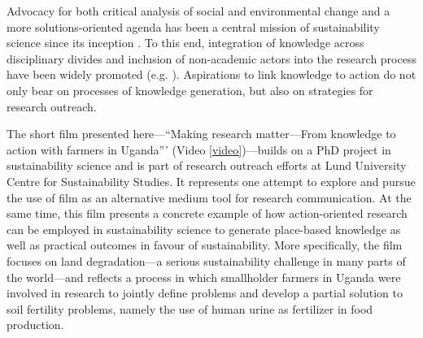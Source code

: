 \documentclass[10pt,a4paper]{article}
\begin{document}
\par\endgroup
 
\setlength{\parindent}{0.5cm}
\setlength{\parskip}{0cm}
\setlength{\bibsep}{0cm}

\vspace*{5mm}

\begin{multicols}{2}

\noindent Advocacy for both critical analysis of social and environmental change and a more solutions-oriented agenda has been a central mission of sustainability science since its inception \citep{r08}. To this end, integration of knowledge across disciplinary divides and inclusion of non-academic actors into the research process have been widely promoted (e.g. \citep{r01, r02, r03}). Aspirations to link knowledge to action do not only bear on processes of knowledge generation, but also on strategies for research outreach.

The short film presented here---``Making research matter---From knowledge to action with farmers in Uganda''' (Video \ref{video})---builds on a PhD project in sustainability science \citep{r04} and is part of research outreach efforts at Lund University Centre for Sustainability Studies. It represents one attempt to explore and pursue the use of film as an alternative medium tool for research communication. At the same time, this film presents a concrete example of how action-oriented research can be employed in sustainability science to generate place-based knowledge as well as practical outcomes in favour of sustainability. More specifically, the film focuses on land degradation---a serious sustainability challenge in many parts of the world---and reflects a process in which smallholder farmers in Uganda were involved in research to jointly define problems and develop a partial solution to soil fertility problems, namely the use of human urine as fertilizer in food production.


\end{multicols}
\end{document}
